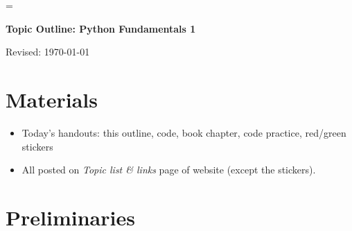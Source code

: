 \documentclass[11pt]{article}
\begin{document}
\parskip=\bigskipamount
\parindent=0.0in
\thispagestyle{empty}


\bigskip\bigskip
\centerline{\Large \bf Topic Outline:  Python Fundamentals 1}
\centerline{Revised: \today}


\section*{Materials}

\begin{itemize}
\item  Today's handouts:  this outline, code, book chapter, code practice, red/green stickers
\item  All posted on {\it Topic list \& links\/} page of website (except the stickers).
\end{itemize}


\section*{Preliminaries}
\end{document}

